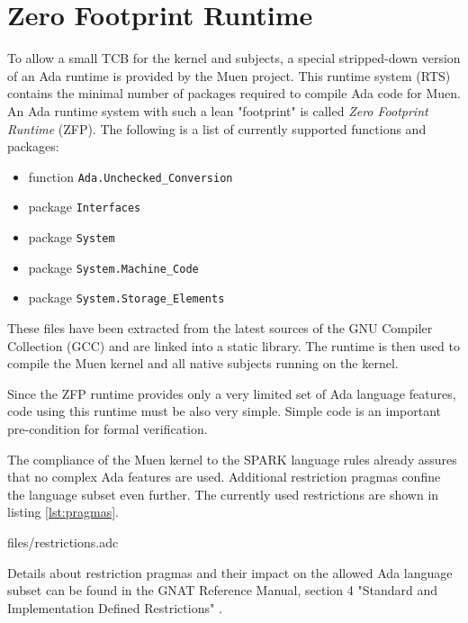 \section{Zero Footprint Runtime}\label{sec:zfp-rts}
To allow a small TCB for the kernel and subjects, a special stripped-down
version of an Ada runtime is provided by the Muen project. This
runtime system (RTS) contains the minimal number of packages
required to compile Ada code for Muen. An Ada runtime system with such a lean
"footprint" is called \emph{Zero Footprint Runtime} (ZFP). The
following is a list of currently supported functions and packages:

\begin{itemize}
	\item function \texttt{Ada.Unchecked\_Conversion}
	\item package \texttt{Interfaces}
	\item package \texttt{System}
	\item package \texttt{System.Machine\_Code}
	\item package \texttt{System.Storage\_Elements}
\end{itemize}

These files have been extracted from the latest sources of the GNU Compiler
Collection (GCC) \cite{gcc} and are linked into a static library.
The runtime is then used to compile the Muen kernel and all native subjects
running on the kernel.

Since the ZFP runtime provides only a very limited set of Ada language features,
code using this runtime must be also very simple. Simple code is an important
pre-condition for formal verification.

The compliance of the Muen kernel to the SPARK language rules
already assures that no complex Ada features are used. Additional restriction
pragmas confine the language subset even further. The currently
used restrictions are shown in listing \ref{lst:pragmas}.


	{files/restrictions.adc}

Details about restriction pragmas and their impact on the allowed Ada language
subset can be found in the GNAT Reference Manual, section 4 "Standard and
Implementation Defined Restrictions" \cite{GNAT:manual}.
